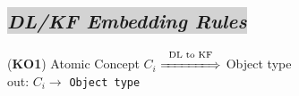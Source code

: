 \documentclass[sn-mathphys]{sn-jnl}
\begin{document}
{{{{\subsection{\colorbox{lightgray}{\em DL/KF Embedding Rules}}








\noindent ({\bf KO1}) {Atomic Concept $C_i$} $\overset{\text{DL to KF}}{\xLongrightarrow{\hspace*{1.4cm}}}$ {Object type}  \\
\hspace*{0.5cm}out:  $C_i \rightarrow$ {\tt Object type }\\




}}}}
\end{document}

